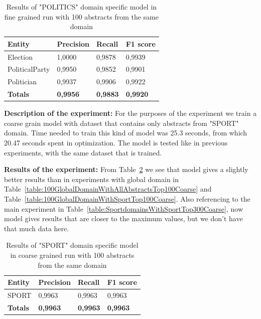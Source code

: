 \documentclass[thesis=M,english]{FITthesis}[2018/05/30]
\begin{document}
	\begin{table}[H]\centering
		\begin{tabular}{|l|l|l|l|}
			\hline {\textbf{Entity}} & {\textbf{Precision}} & {\textbf{Recall}} & {\textbf{F1 score}}\\\hline
				Election & 1,0000 & 0,9878 & 0,9939\\
				PoliticalParty & 0,9950 & 0,9852 & 0,9901\\
				Politician & 0,9937 & 0,9906 & 0,9922\\\hline
				\textbf{Totals} & \textbf{0,9956} & \textbf{0,9883} & \textbf{0,9920}\\\hline
		\end{tabular}
		\caption{Results of "POLITICS" domain specific model in fine grained run with 100 abstracts from the same domain \label{table:100PoliticsDomainWithPoliticsTop100Fine}}
	\end{table}	
	

	\textbf{Description of the experiment:} For the purposes of the experiment we train a coarse grain model with dataset that contains only abstracts from "SPORT" domain. Time needed to train this kind of model was 25.3 seconds, from which 20.47 seconds spent in optimization. The model is tested like in previous experiments, with the same dataset that is trained.

	\textbf{Results of the experiment:} From Table~\ref{table:100SportDomainWithSportTop100Coarse} we see that model gives a slightly better results than in experiments with global domain in Table~\ref{table:100GlobalDomainWithAllAbstractsTop100Coarse} and Table~\ref{table:100GlobalDomainWithSportTop100Coarse}. Also referencing to the main experiment in Table~\ref{table:SportdomainsWithSportTop300Coarse}, now model gives results that are closer to the maximum values, but we don't have that much data here.

	\begin{table}[H]\centering
		\begin{tabular}{|l|l|l|l|}
			\hline {\textbf{Entity}} & {\textbf{Precision}} & {\textbf{Recall}} & {\textbf{F1 score}}\\\hline
				SPORT & 0,9963 & 0,9963 & 0,9963\\\hline
				\textbf{Totals} & \textbf{0,9963} & \textbf{0,9963} & \textbf{0,9963}\\\hline
		\end{tabular}
		\caption{Results of "SPORT" domain specific model in coarse grained run with 100 abstracts from the same domain \label{table:100SportDomainWithSportTop100Coarse}}
	\end{table}
\end{document}
